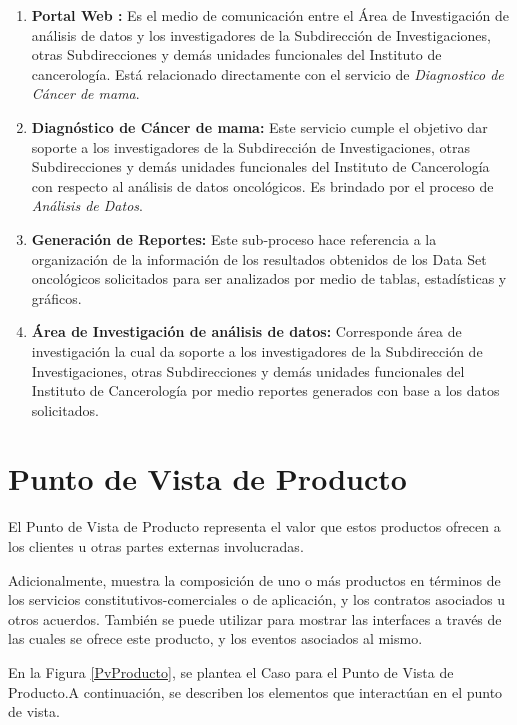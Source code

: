 \begin{enumerate}[label=\textbf{\arabic*})]
\item  \textbf{Portal Web :} Es el medio de comunicación entre el Área de Investigación de análisis de datos  y los investigadores de la Subdirección de Investigaciones, otras Subdirecciones y demás unidades funcionales del Instituto  de cancerología. Está relacionado directamente con el servicio de \textit{Diagnostico de Cáncer de mama}. 

\item  \textbf{Diagnóstico de Cáncer de mama:} Este servicio cumple el objetivo dar soporte a los investigadores de la Subdirección de Investigaciones, otras Subdirecciones y demás unidades funcionales del Instituto  de Cancerología con respecto al análisis de datos oncológicos.  Es brindado por el proceso de \textit{Análisis de Datos}.
\newpage
\item  \textbf{Generación  de Reportes:} Este sub-proceso hace referencia a la organización de la información de los resultados obtenidos de los Data Set oncológicos solicitados para ser analizados por medio de tablas, estadísticas y gráficos.

\item \textbf{Área de Investigación de análisis de datos:} Corresponde área de investigación la cual da soporte a los investigadores de la Subdirección de Investigaciones, otras Subdirecciones y demás unidades funcionales del Instituto  de Cancerología por medio reportes generados con base a los datos solicitados.

\end{enumerate}

\newpage
\section{Punto de Vista de Producto}
El Punto de Vista de Producto representa el valor que estos productos ofrecen a los clientes u otras partes externas involucradas\cite{BolanosCastro2019}.

Adicionalmente, muestra la composición de uno o más productos en términos de los servicios constitutivos-comerciales o de aplicación, y los contratos asociados u otros acuerdos. También se puede utilizar para mostrar las interfaces a través de las cuales se ofrece este producto, y los eventos asociados al mismo\cite{BolanosCastro2019}.

En la Figura \ref{PvProducto}, se plantea el Caso para el Punto de Vista de Producto.A continuación, se describen los elementos que interactúan en el punto de vista.

